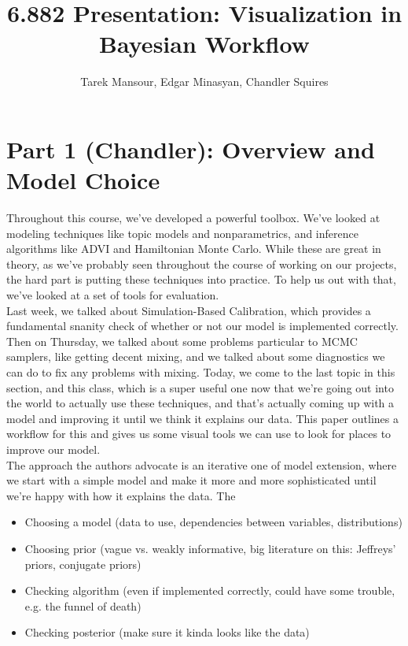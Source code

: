 \documentclass[]{article}
\title{6.882 Presentation: Visualization in Bayesian Workflow}
\author{Tarek Mansour, Edgar Minasyan, Chandler Squires}
\date{}
\begin{document}
\maketitle
\thispagestyle{empty}

\section*{Part 1 (Chandler): Overview and Model Choice}

Throughout this course, we've developed a powerful toolbox. We've looked at modeling techniques like topic models and nonparametrics, and inference algorithms like ADVI and Hamiltonian Monte Carlo. While these are great in theory, as we've probably seen throughout the course of working on our projects, the hard part is putting these techniques into practice. To help us out with that, we've looked at a set of tools for evaluation.
\\

Last week, we talked about Simulation-Based Calibration, which provides a fundamental snanity check of whether or not our model is implemented correctly. Then on Thursday, we talked about some problems particular to MCMC samplers, like getting decent mixing, and we talked about some diagnostics we can do to fix any problems with mixing. Today, we come to the last topic in this section, and this class, which is a super useful one now that we're going out into the world to actually use these techniques, and that's actually coming up with a model and improving it until we think it explains our data. This paper outlines a workflow for this and gives us some visual tools we can use to look for places to improve our model.
\\

The approach the authors advocate is an iterative one of model extension, where we start with a simple model and make it more and more sophisticated until we're happy with how it explains the data. The 
\begin{itemize}
	\item Choosing a model (data to use, dependencies between variables, distributions)
	\item Choosing prior (vague vs. weakly informative, big literature on this: Jeffreys' priors, conjugate priors)
	\item Checking algorithm (even if implemented correctly, could have some trouble, e.g. the funnel of death)
	\item Checking posterior (make sure it kinda looks like the data)
\end{itemize}
\end{document}
